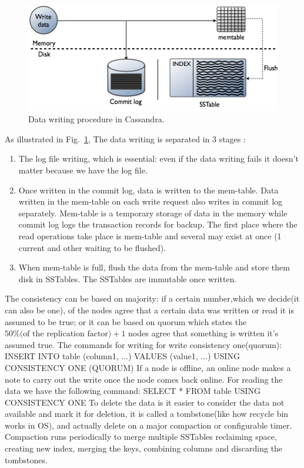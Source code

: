 \documentclass[a4page, 11pt]{article}
\begin{document}
\begin{figure}
\centering
\includegraphics[width=100 mm]{cassandrawrite.png}
\caption{\label{cassandrawrite:fig} Data writing procedure in Cassandra.}
\end{figure}
As illustrated in Fig.~\ref{cassandrawrite:fig}, The data writing is separated in 3 stages : 
\begin{enumerate}
	\item The log file writing, which is essential: even if the data writing fails it doesn't matter because we have the log file.
	\item Once written in the commit log, data is written to the mem-table. Data written in the mem-table on each write request also writes in commit log separately. Mem-table is a temporary storage of data in the memory while commit log logs the transaction records for backup.
	\newline The first place where the read operations take place is mem-table and several may exist at once (1 current and other waiting to be flushed). 
	\item When mem-table is full, flush the data from the mem-table and store them disk in SSTables. The SSTables are immutable once written.
\end{enumerate}
The consistency can be based on majority: if a certain number,which we decide(it can also be one), of the nodes agree that a certain data was written or read it is assumed to be true; \newline
or it can be based on quorum which states the $50\%\text{(of the replication factor)}+1$ nodes agree that something is written it's assumed true.
\newline
The commands for writing for write consistency one(quorum): \newline
INSERT INTO table (column1, ...) VALUES (value1, ...) USING CONSISTENCY ONE (QUORUM)\newline
If a node is offline, an online node makes a note to carry out the write once the node comes back online.
For reading the data we have the following command:
SELECT * FROM table USING CONSISTENCY ONE
\newline
To delete the data is it easier to consider the data not available and mark it for deletion, it is called a tombstone(like how recycle bin works in OS), and actually delete on a major compaction or configurable timer.\newline
Compaction runs periodically to merge multiple SSTables reclaiming space, creating new index, merging the keys, combining columns and discarding the tombstones.
\end{document}
